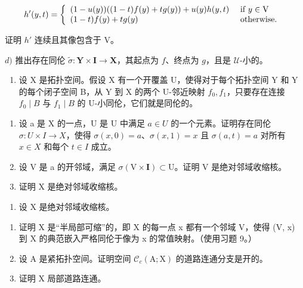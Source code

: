 \[
h ^ {\prime} (y, t) = \left\{ \begin{array}{l l} (1 - u (y)) ((1 - t) f (y) + t g (y)) + u (y) h (y, t) & \text { if } y \in \mathrm{V} \\ (1 - t) f (y) + t g (y) & \text { otherwise. } \end{array} \right.
\]

证明 \(h'\) 连续且其像包含于 V。

\(d)\) 推出存在同伦 \(\widetilde{\sigma}\colon\mathbf{Y}\times\mathbf{I}\to\mathbf{X}\)，其起点为 \(f\)、终点为 \(g\)，且是 \(\mathcal{U}\)-小的。

\begin{enumerate}
\def\labelenumi{\arabic{enumi})}
\setcounter{enumi}{9}
\tightlist
\item
  设 X 是拓扑空间。假设 X 有一个开覆盖 U，使得对于每个拓扑空间 Y 和 Y 的每个闭子空间 B，从 Y 到 X 的两个 U-邻近映射 \(f_{0}, f_{1}\)，只要存在连接 \(f_{0} \mid B\) 与 \(f_{1} \mid B\) 的 U-小同伦，它们就是同伦的。
\end{enumerate}

\begin{enumerate}
\def\labelenumi{\alph{enumi})}
\item
  设 a 是 X 的一点，U 是 U 中满足 \(a \in U\) 的一个元素。证明存在同伦 \(\sigma: U \times I \to X\)，使得 \(\sigma(x,0) = a\)、\(\sigma(x,1) = x\) 且 \(\sigma(a,t) = a\) 对所有 \(x \in X\) 和每个 \(t \in I\) 成立。
\item
  设 V 是 a 的开邻域，满足 \(\sigma(\mathrm{V} \times \mathbf{I}) \subset \mathrm{U}\)。证明 V 是绝对邻域收缩核。
\item
  证明 X 是绝对邻域收缩核。
\end{enumerate}

\begin{enumerate}
\def\labelenumi{\arabic{enumi})}
\setcounter{enumi}{10}
\tightlist
\item
  设 X 是绝对邻域收缩核。
\end{enumerate}

\begin{enumerate}
\def\labelenumi{\alph{enumi})}
\item
  证明 X 是“半局部可缩”的，即 X 的每一点 x 都有一个邻域 V，使得 (V, x) 到 X 的典范嵌入严格同伦于像为 x 的常值映射。（使用习题 9。）
\item
  设 A 是紧拓扑空间。证明空间 \(\mathcal{C}_{c}(\mathrm{A};\mathrm{X})\) 的道路连通分支是开的。
\item
  证明 X 局部道路连通。
\end{enumerate}

